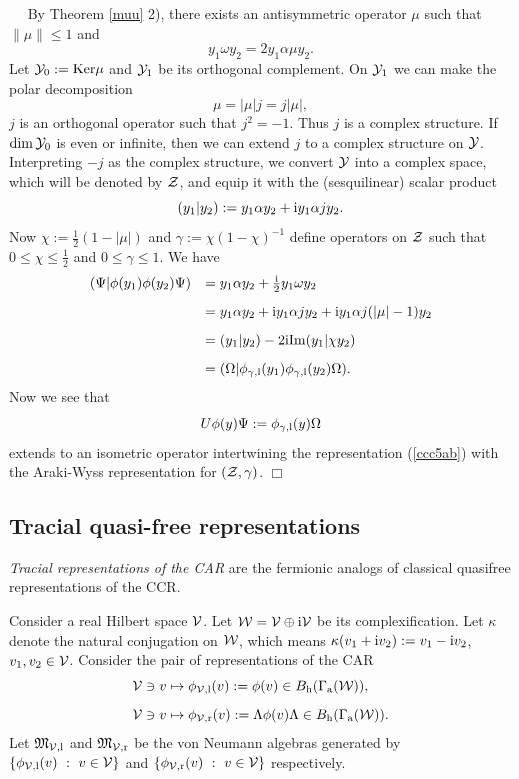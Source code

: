 \documentclass{svmult}
\newcommand{\beq}{\begin{equation}}
\newcommand{\eeq}{\end{equation}}
\def\Im{{\rm Im}}
\def\l{{\rm l}}
\def\r{{\rm r}}
\def\proof{
\noindent{\bf Proof.}\ \ }
\def\h{{\rm h}}
\def\cZ{{\cal Z}}
\def\cY{{\cal Y}}
\def\cV{{\cal V}}
\def\cW{{\cal W}}
\def\fM{{\mathfrak M}}
\def\a{{\rm a}}
\def\i{{\rm i}}
\def\Ker{{\rm Ker}}
\def\qed{$\Box$\medskip}
\def\l{{\rm l}}
\def\r{{\rm r}}
\def\Ker{{\rm Ker}}
\begin{document}
\proof
By Theorem \ref{muu} 2),
there exists an antisymmetric operator $\mu$ such that $\|\mu\|\leq1$ and
\[y_1\omega y_2=2y_1\alpha\mu y_2.\]
Let $\cY_0:=\Ker\mu$ and $\cY_1$ be its orthogonal complement.
On $\cY_1$ we can make the polar decomposition 
\[\mu=|\mu|j=j|\mu|,\]
$j$ is an orthogonal operator such that $j^2=-1$. Thus $j$ is a complex
structure. If $\dim\cY_0$ is even or infinite, then we  can extend $j$ to a
complex structure on $\cY$.
Interpreting $-j$ as the complex structure, we convert $\cY$ into a complex
space, which will be denoted by $\cZ$,
 and equip it with the (sesquilinear) scalar product
\[(y_1|y_2):=y_1\alpha y_2+\i y_1\alpha jy_2.\]
Now  $\chi:=\frac12(1-|\mu|)$ 
and $\gamma:=\chi(1-\chi)^{-1}$
define  operators on $\cZ$ such that
$0\leq\chi\leq \frac12$ and $0\leq\gamma\leq1$. We have
\[\begin{array}{rl}
(\Psi|\phi(y_1)\phi(y_2)\Psi)&=
y_1\alpha y_2+\frac{\i}{2} y_1\omega y_2\\[3mm]
&=y_1\alpha y_2+\i y_1\alpha jy_2+\i y_1\alpha j(|\mu|-1) y_2\\[3mm]
&=(y_1|y_2)-2\i\Im (y_1|\chi y_2)\\[3mm]
&=
(\Omega|\phi_{\gamma,\l}(y_1)\phi_{\gamma,\l}(y_2)\Omega).
\end{array}\]
Now we see that 
\[U\phi(y)\Psi:=\phi_{\gamma,\l}(y)\Omega\]
extends to an isometric operator intertwining
 the representation (\ref{ccc5ab}) with the Araki-Wyss representation for 
 $(\cZ,\gamma)$. 
 \qed



\subsection{Tracial quasi-free representations}

{\em Tracial representations of the CAR}
 are the fermionic analogs of classical
quasifree representations of the CCR.  

Consider a real Hilbert space $\cV$. Let $\cW=\cV\oplus\i\cV$ be its
 complexification. Let $\kappa$ denote the natural conjugation on $\cW$,
which means $\kappa(v_1+\i v_2):=v_1-\i v_2$, $v_1,v_2\in\cV$.
 Consider the pair 
of representations 
of the CAR
\beq\begin{array}{l}
\cV\ni v\mapsto\phi_{\cV,\l}(v):=\phi(v)\in B_\h(\Gamma_\a(\cW)),\\[3mm]
\cV\ni v\mapsto\phi_{\cV,\r}(v):=
\Lambda\phi(v)\Lambda\in B_\h(\Gamma_\a(\cW)).\end{array}\label{cas}\eeq
Let $\fM_{\cV,\l}$ and $\fM_{\cV,\r}$ be the 
von Neumann algebras generated by 
$\{\phi_{\cV,\l}(v)\ :\ v\in\cV\}$
 and $\{\phi_{\cV,\r}(v)\ :\ v\in\cV\}$ respectively.
\end{document}
